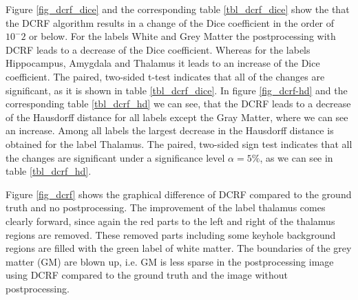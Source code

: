 \documentclass[journal]{IEEEtran}
\begin{document}
Figure \ref{fig_dcrf_dice} and the corresponding table \ref{tbl_dcrf_dice} show the that the DCRF algorithm results in a change of the Dice coefficient in the order of $10^-2$ or below. For the labels White and Grey Matter the postprocessing with DCRF leads to a decrease of the Dice coefficient. Whereas for the labels Hippocampus, Amygdala and Thalamus it leads to an increase of the Dice coefficient. The paired, two-sided t-test indicates that all of the changes are significant, as it is shown in table \ref{tbl_dcrf_dice}. In figure \ref{fig_dcrf-hd} and the corresponding table \ref{tbl_dcrf_hd} we can see, that the DCRF leads to a decrease of the Hausdorff distance for all labels except the Gray Matter, where we can see an increase. Among all labels the largest decrease in the Hausdorff distance is obtained for the label Thalamus. The paired, two-sided sign test indicates that all the changes are significant under a significance level $\alpha = 5\%$, as we can see in table \ref{tbl_dcrf_hd}.

Figure \ref{fig_dcrf} shows the graphical difference of DCRF compared to the ground truth and no postprocessing. The improvement of the label thalamus comes clearly forward, since again the red parts to the left and right of the thalamus regions are removed. These removed parts including some keyhole background regions are filled with the green label of white matter. 
The boundaries of the grey matter (GM) are blown up, i.e. GM is less sparse in the postprocessing image using DCRF compared to the ground truth and the image without postprocessing.

\end{document}
